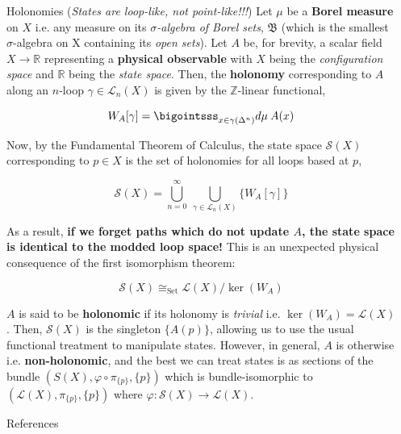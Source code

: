 \documentclass[final]{beamer}
\newenvironment{highlight}
{\begin{tcolorbox}[colback=lightblue, boxrule=0pt, frame empty]}
{\end{tcolorbox}}
\newlength{\sepwidth}
\newlength{\colwidth}
\newcommand{\separatorcolumn}{\begin{column}{\sepwidth}\end{column}}
\newcommand{\mb}{\mathbb}
\newcommand{\mc}{\mathcal}
\newcommand{\mf}{\mathfrak}
\theoremstyle{remark}
\begin{document}
\begin{frame}[t]
\begin{columns}[t]
\begin{column}{\colwidth}
\begin{block}{Holonomies (\emph{States are loop-like, \emph{not} point-like!!!})}
Let $\mu$ be a \textbf{Borel measure} on $X$ i.e. any measure on its \emph{$\sigma$-algebra of Borel sets}, $\mf{B}$ (which is the smallest $\sigma$-algebra on X containing its \emph{open sets}). Let $A$ be, for brevity, a scalar field $X \to \mb{R}$ representing a \textbf{physical observable} with $X$ being the \emph{configuration space} and $\mb{R}$ being the \emph{state space}. Then, the \textbf{holonomy} corresponding to $A$ along an $n$-loop $\gamma \in \mc{L}_n(X)$ is given by the $\mb{Z}$-linear functional,

$$W_A[\gamma] = \bigointsss_{x \in \gamma(\Delta^n)} d \mu \: A(x)$$

Now, by the Fundamental Theorem of Calculus, the state space $\mc{S}(X)$ corresponding to $p \in X$ is the set of holonomies for all loops based at $p$,

$$\mc{S}(X) = \bigcup_{n = 0}^{\infty} \: \bigcup_{\gamma \in \mc{L}_n(X)} \{ W_A[\gamma] \}$$

As a result, \textbf{if we forget paths which do not update $A$, the state space is identical to the modded loop space!} This is an unexpected physical consequence of the first isomorphism theorem:

\begin{highlight}
$$\mc{S}(X) \cong_{\text{Set}} \mc{L}(X)/{\ker(W_A)}$$
\end{highlight}

$A$ is said to be \textbf{holonomic} if its holonomy is \emph{trivial} i.e. $\ker(W_A) = \mc{L}(X)$. Then, $\mc{S}(X)$ is the singleton $\{ A(p) \}$, allowing us to use the usual functional treatment to manipulate states. However, in general, $A$ is otherwise i.e. \textbf{non-holonomic}, and the best we can treat states is as sections of the bundle $(S(X), \varphi \circ \pi_{\{ p \}}, \{ p \})$ which is bundle-isomorphic to $(\mc{L}(X), \pi_{\{ p \}}, \{ p \})$ where $\varphi : \mc{S}(X) \to \mc{L}(X)$.

\end{block}

\begin{block}{References}

\nocite{*}
\footnotesize{}

\end{block}

\end{column}

\separatorcolumn
\end{columns}
\end{frame}
\end{document}
